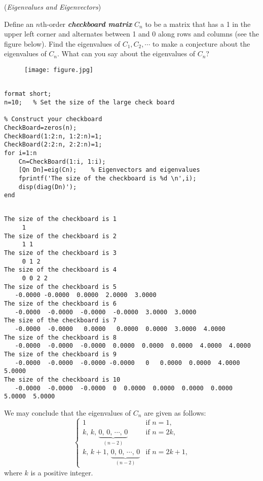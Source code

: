 \vspace{3mm}

\begin{exer}(\textit{Eigenvalues and Eigenvectors})

Define an $n$th-order \textbf\textit{checkboard matrix} $C_{n}$ to be a matrix that has a 1 in the upper left corner and alternates between 1 and 0 along rows and columns (see the figure below). Find the eigenvalues of $C_{1}, C_{2}, \cdots$ to make a conjecture about the eigenvalues of $C_{n}$. What can you say about the eigenvalues of $C_{n}$? 
\begin{figure}[h]\centering
\texttt{[image: figure.jpg]}
\end{figure}
\end{exer}

\begin{sol}
\begin{verbatim}

format short;
n=10;   % Set the size of the large check board

% Construct your checkboard
CheckBoard=zeros(n);    
CheckBoard(1:2:n, 1:2:n)=1;
CheckBoard(2:2:n, 2:2:n)=1;
for i=1:n
    Cn=CheckBoard(1:i, 1:i);
    [Qn Dn]=eig(Cn);    % Eigenvectors and eigenvalues
    fprintf('The size of the checkboard is %d \n',i);
    disp(diag(Dn)');
end
\end{verbatim}

\begin{outputs}

\begin{verbatim}

The size of the checkboard is 1 
     1
The size of the checkboard is 2 
     1 1
The size of the checkboard is 3 
     0 1 2
The size of the checkboard is 4 
     0 0 2 2
The size of the checkboard is 5 
   -0.0000 -0.0000  0.0000  2.0000  3.0000
The size of the checkboard is 6 
   -0.0000  -0.0000  -0.0000  -0.0000  3.0000  3.0000
The size of the checkboard is 7 
   -0.0000  -0.0000   0.0000   0.0000  0.0000  3.0000  4.0000
The size of the checkboard is 8 
   -0.0000  -0.0000  -0.0000  0.0000  0.0000  0.0000  4.0000  4.0000
The size of the checkboard is 9 
   -0.0000  -0.0000  -0.0000 -0.0000   0   0.0000  0.0000  4.0000  5.0000
The size of the checkboard is 10 
   -0.0000  -0.0000  -0.0000  0  0.0000  0.0000  0.0000  0.0000  5.0000  5.0000
\end{verbatim}
\end{outputs}


\noindent We may conclude that the eigenvalues of $C_{n}$ are given as follows:
$$\begin{cases} 1 &\text{if $n=1$,}\\ 
 k,\, k,\, \underbrace{0,\,0,\,\cdots,\,0}_{(n-2)}&\text{if $n=2k$,}\\
 k,\,k+1,\,\underbrace{0,\,0,\,\cdots,\,0}_{(n-2)}&\text{if $n=2k+1$,}
\end{cases}
$$ 
where $k$ is a positive integer.
\end{sol}
